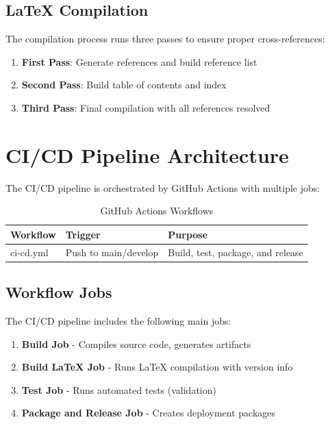 \subsection{LaTeX Compilation}

The compilation process runs three passes to ensure proper cross-references:

\begin{enumerate}
    \item \textbf{First Pass}: Generate references and build reference list
    \item \textbf{Second Pass}: Build table of contents and index
    \item \textbf{Third Pass}: Final compilation with all references resolved
\end{enumerate}

\section{CI/CD Pipeline Architecture}
\label{sec:CIPipeline}

The CI/CD pipeline is orchestrated by GitHub Actions with multiple jobs:

\begin{table}[h]
\centering
\begin{tabular}{|l|l|l|}
\hline
\textbf{Workflow} & \textbf{Trigger} & \textbf{Purpose} \\
\hline
ci-cd.yml & Push to main/develop & Build, test, package, and release \\
\hline
\end{tabular}
\caption{GitHub Actions Workflows}
\label{table:workflows}
\end{table}

\subsection{Workflow Jobs}

The CI/CD pipeline includes the following main jobs:

\begin{enumerate}
    \item \textbf{Build Job} - Compiles source code, generates artifacts
    \item \textbf{Build LaTeX Job} - Runs LaTeX compilation with version info
    \item \textbf{Test Job} - Runs automated tests (validation)
    \item \textbf{Package and Release Job} - Creates deployment packages
\end{enumerate}

